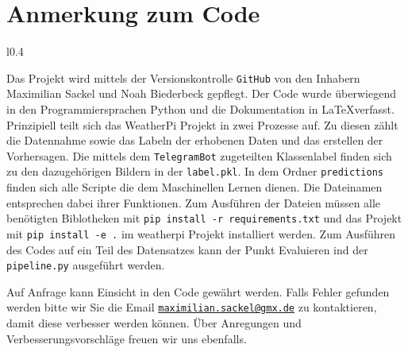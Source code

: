 \newpage
\section{Anmerkung zum Code}
\label{sec:06_code_anhang}
\begin{wrapfigure}{l}{0.4\textwidth}
\end{wrapfigure}
Das Projekt wird mittels der Versionskontrolle \texttt{GitHub} von den Inhabern
Maximilian Sackel
und Noah Biederbeck gepflegt. 
Der Code wurde überwiegend in den Programmiersprachen Python und die
Dokumentation in \LaTeX verfasst.
Prinzipiell teilt sich das WeatherPi Projekt in zwei Prozesse auf. 
Zu diesen zählt die Datennahme sowie das Labeln der erhobenen Daten und das
erstellen der Vorhersagen.
Die mittels dem \texttt{TelegramBot} zugeteilten Klassenlabel finden sich zu den
dazugehörigen Bildern in der \texttt{label.pkl}.
In dem Ordner \texttt{predictions} finden sich alle Scripte die dem Maschinellen
Lernen dienen.
Die Dateinamen entsprechen dabei ihrer Funktionen.
Zum Ausführen der Dateien müssen alle benötigten Biblotheken mit 
\verb|pip install -r requirements.txt| und das Projekt mit 
\verb|pip install -e .| im weatherpi Projekt installiert werden. 
Zum Ausführen des Codes auf ein Teil des Datensatzes kann der Punkt Evaluieren
ind der \texttt{pipeline.py} ausgeführt werden.

Auf Anfrage kann Einsicht in den Code gewährt werden.
Falls Fehler gefunden werden bitte wir Sie die Email
\href{mailto:maximilian.sackel@gmx.de}{\texttt{maximilian.sackel@gmx.de}} zu 
kontaktieren, damit diese verbesser werden können.
Über Anregungen und Verbesserungsvorschläge freuen wir uns ebenfalls.
